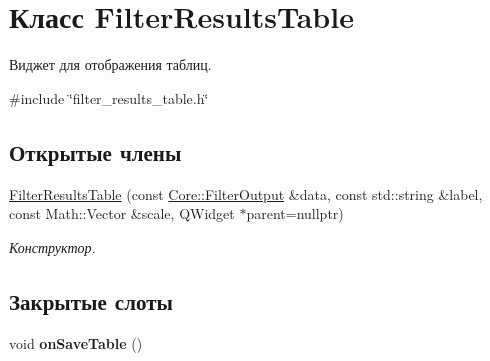 \hypertarget{class_filter_results_table}{}\section{Класс Filter\+Results\+Table}
\label{class_filter_results_table}


Виджет для отображения таблиц.  




{\ttfamily \#include \char`\"{}filter\+\_\+results\+\_\+table.\+h\char`\"{}}

\subsection*{Открытые члены}
\begin{DoxyCompactItemize}
\item 
\hypertarget{class_filter_results_table_a343f304fd53bc8ed9f680ffb5ac6c8b4}{}\label{class_filter_results_table_a343f304fd53bc8ed9f680ffb5ac6c8b4} 
\hyperlink{class_filter_results_table_a343f304fd53bc8ed9f680ffb5ac6c8b4}{Filter\+Results\+Table} (const \hyperlink{namespace_core_a60877581a235fc9566087b54d463ce9c}{Core\+::\+Filter\+Output} \&data, const std\+::string \&label, const Math\+::\+Vector \&scale, Q\+Widget $\ast$parent=nullptr)
\begin{DoxyCompactList}\small\item\em Конструктор. \end{DoxyCompactList}\end{DoxyCompactItemize}
\subsection*{Закрытые слоты}
\begin{DoxyCompactItemize}
\item 
\hypertarget{class_filter_results_table_a160f51c55773ed7981b67df9c3d533d8}{}\label{class_filter_results_table_a160f51c55773ed7981b67df9c3d533d8} 
void {\bfseries on\+Save\+Table} ()
\end{DoxyCompactItemize}
